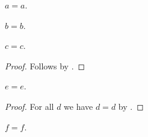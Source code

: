 \begin{proposition}\label{prop1}
    $a = a$.
\end{proposition}

\begin{proposition}\label{prop2}
    $b = b$.
\end{proposition}

\begin{proposition}\label{prop3}
    $c = c$.
\end{proposition}
\begin{proof}
    Follows by . %
\end{proof}

\begin{proposition}\label{prop4}
    $e = e$.
\end{proposition}
\begin{proof}
    For all $d$ we have $d = d$ by .
\end{proof}

\begin{proposition}\label{prop5}
    $f = f$.
\end{proposition}
